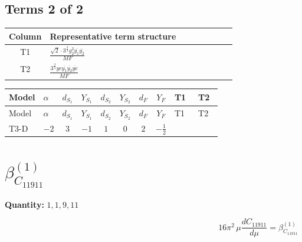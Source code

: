 \documentclass[8pt]{article}
\begin{document}
\begin{landscape}
\subsection*{Terms 2 of 2}
\begin{center}
\begin{tabular}{@{}c >{\raggedright\arraybackslash}p{0.82\linewidth}@{}}
\toprule
Column & Representative term structure \\
\midrule
T1 & \(\displaystyle \frac{\sqrt{2} \cdot 3^{\frac{3}{4}} g_{2}^{2} \overline{y_{1}} \overline{y_{2}}}{MF}\) \\
\midrule
T2 & \(\displaystyle \frac{3^{\frac{3}{4}} ye \overline{y_{1}} \overline{y_{2}} \overline{ye}}{MF}\) \\
\midrule
\bottomrule
\end{tabular}
\end{center}
\smallskip
\tiny
\begin{longtable}{@{}llcccccc >{\raggedright\arraybackslash}p{0.21\linewidth} >{\raggedright\arraybackslash}p{0.21\linewidth}@{}}
\toprule
Model & $\alpha$ & $d_{S_1}$ & $Y_{S_1}$ & $d_{S_2}$ & $Y_{S_2}$ & $d_F$ & $Y_F$ & T1 & T2 \\
\midrule
\endfirsthead
\toprule
Model & $\alpha$ & $d_{S_1}$ & $Y_{S_1}$ & $d_{S_2}$ & $Y_{S_2}$ & $d_F$ & $Y_F$ & T1 & T2 \\
\midrule
\endhead
T3-D & $-2$ & $3$ & $-1$ & $1$ & $0$ & $2$ & $-\frac{1}{2}$ & \scriptsize\adjustbox{max width=\linewidth}{$\begin{gathered} - \frac{\sqrt{2} \cdot 3^{\frac{3}{4}} g_{2}^{2} \overline{y_{1}} \overline{y_{2}}}{3 MF}\end{gathered}$} & \scriptsize\adjustbox{max width=\linewidth}{$\begin{gathered} \frac{3^{\frac{3}{4}} ye \overline{y_{1}} \overline{y_{2}} \overline{ye}}{12 MF}\end{gathered}$} \\
\midrule
\bottomrule
\end{longtable}
\clearpage
\section*{$\beta_{C_{11911}}^{(1)}$}
\noindent\textbf{Quantity: }$\mathrm{1,1,9,11}$\par\smallskip
\[16\pi^2\,\mu\frac{d C_{11911}}{d\mu}=\beta_{C_{11911}}^{(1)}\]

\end{landscape}
\end{document}
